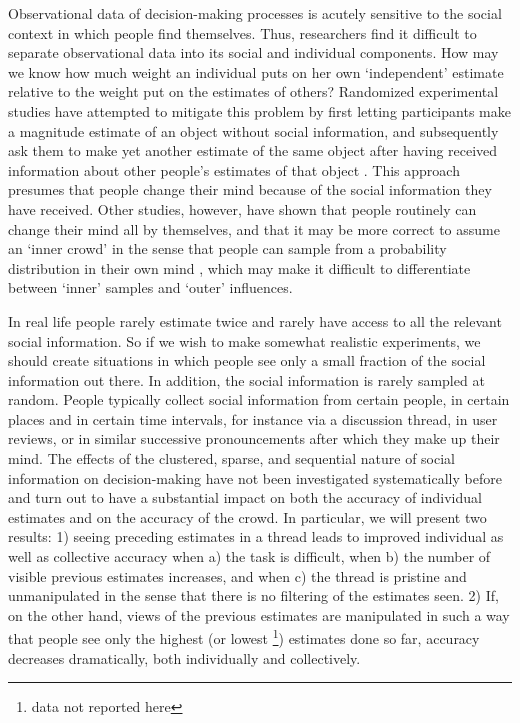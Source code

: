 \documentclass[9pt,twocolumn,twoside,lineno]{article}
\begin{document}
Observational data of decision-making processes is acutely sensitive to the social context in which people find themselves. Thus, researchers find it difficult to separate observational data into its social and individual components. How may we know how much weight an individual puts on her own ‘independent’ estimate relative to the weight put on the estimates of others? Randomized experimental studies have attempted to mitigate this problem by first letting participants make a magnitude estimate of an object without social information, and subsequently ask them to make yet another estimate of the same object after having received information about other people’s estimates of that object \cite{becker2017network, jayles2017social, lorenz2011social, sniezek1995cueing, mavrodiev2013quantifying}. This approach presumes that people change their mind because of the social information they have received. Other studies, however, have shown that people routinely can change their mind all by themselves, and that it may be more correct to assume an `inner crowd' in the sense that people can sample from a probability distribution in their own mind \cite{vul2008measuring, herzog2009wisdom, herzog2014harnessing}, which may make it difficult to differentiate between `inner' samples and `outer' influences.

In real life people rarely estimate twice and rarely have access to all the relevant social information. So if we wish to make somewhat realistic experiments, we should create situations in which people see only a small fraction of the social information out there. In addition, the social information is rarely sampled at random. People typically collect social information from certain people, in certain places and in certain time intervals, for instance via a discussion thread, in user reviews, or in similar successive pronouncements after which they make up their mind. The effects of the clustered, sparse, and sequential nature of social information on decision-making have not been investigated systematically before and turn out to have a substantial impact on both the accuracy of individual estimates and on the accuracy of the crowd. In particular, we will present two results: 1) seeing preceding estimates in a thread leads to improved individual as well as collective accuracy when a) the task is  difficult, when b) the number of visible previous estimates increases, and when c) the thread is pristine and unmanipulated in the sense that there is no filtering of the estimates seen. 2) If, on the other hand, views of the previous estimates are manipulated in such a way that people see only the highest (or lowest \footnote{data not reported here}) estimates done so far, accuracy decreases dramatically, both individually and collectively. 
\end{document}
